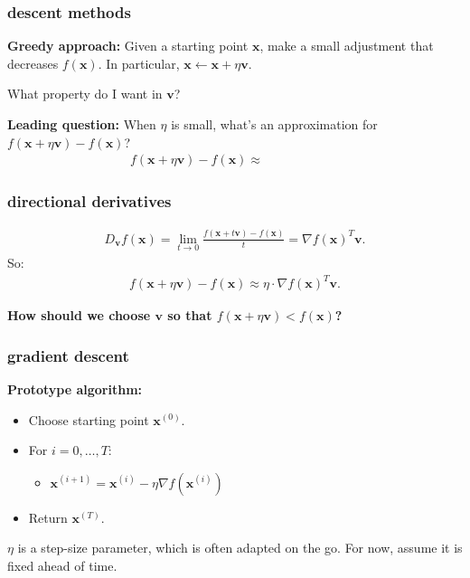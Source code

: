 \documentclass[compress]{beamer}
\newcommand{\bv}[1]{\mathbf{#1}}
\begin{document}
\begin{frame}
	\frametitle{descent methods}
	\textbf{Greedy approach:} Given a starting point $\bv{x}$, make a small adjustment that decreases $f(\bv{x})$. In particular, $\bv{x} \leftarrow \bv{x} + \eta\bv{v}$.
	
	\begin{center}
		\alert{What property do I want in $\bv{v}$?}
	\end{center}
	
	
	\textbf{Leading question:} When $\eta$ is small, what's an approximation for $f(\bv{x} + \eta\bv{v}) - f(\bv{x})$?
	\begin{align*}
		f(\bv{x} + \eta\bv{v}) - f(\bv{x}) \approx \hspace{6em}
	\end{align*}
	
	
\end{frame}

\begin{frame}[t]
	\frametitle{directional derivatives}
	
	\begin{align*}
		D_\bv{v}f(\bv{x}) = \lim_{t\rightarrow 0} \frac{f(\bv{x} + t\bv{v}) - f(\bv{x})}{t} = \nabla f(\bv{x})^T \bv{v}.
	\end{align*}	
	So:
	\begin{align*}
		f(\bv{x} + \eta\bv{v}) - f(\bv{x}) \approx \eta \cdot \nabla f(\bv{x})^T \bv{v}.
	\end{align*}
	
	\textbf{How should we choose $\bv{v}$ so that $f(\bv{x} + \eta\bv{v}) < f(\bv{x})$?} 
	
\end{frame}

\begin{frame}
	\frametitle{gradient descent}
	\textbf{Prototype algorithm:}
	\begin{itemize}
		\item Choose starting point $\bv{x}^{(0)}$.
		\item For $i = 0,\ldots, T$:
		\begin{itemize}
			\item $\bv{x}^{(i+1)} = \bv{x}^{(i)} - \eta \nabla f(\bv{x}^{(i)})$
		\end{itemize}
		\item Return $\bv{x}^{(T)}$.
	\end{itemize}
	
	$\eta$ is a step-size parameter, which is often adapted on the go. For now, assume it is fixed ahead of time.
\end{frame}
\end{document}
